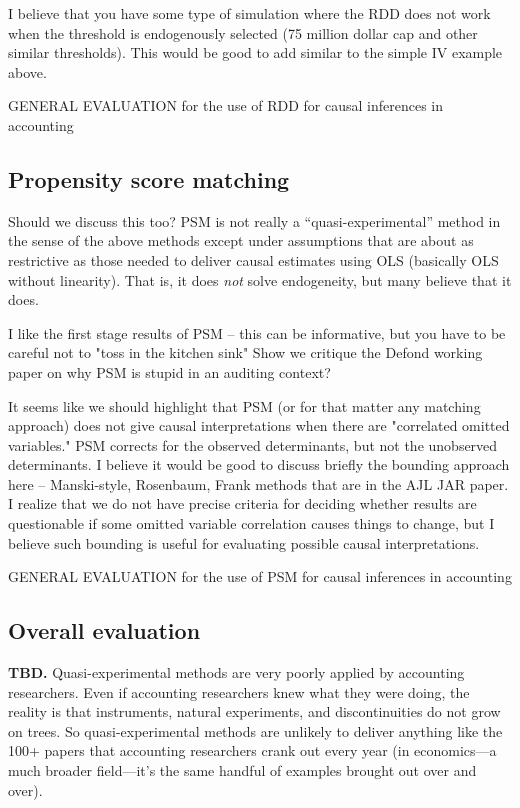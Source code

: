 \documentclass[11pt]{amsart}
\begin{document}
I believe that you have some type of simulation where the RDD does not work when the threshold is endogenously selected (75 million dollar cap and other similar thresholds).  This would be good to add similar to the simple IV example above.

GENERAL EVALUATION for the use of RDD for causal inferences in accounting 


\subsection{Propensity score matching}

Should we discuss this too? PSM is not really a ``quasi-experimental'' method in the sense of the above methods except under assumptions that are about as restrictive as those needed to deliver causal estimates using OLS (basically OLS without linearity). That is, it does \emph{not} solve endogeneity, but many believe that it does.

I like the first stage results of PSM -- this can be informative, but you have to be careful not to "toss in the kitchen sink"  Show we critique the Defond working paper on why PSM is stupid in an auditing context?

It seems like we should highlight that PSM (or for that matter any matching approach) does not give causal interpretations when there are "correlated omitted variables."  PSM corrects for the observed determinants, but not the unobserved determinants.  I believe it would be good to discuss briefly the bounding approach here -- Manski-style, Rosenbaum, Frank methods that are in the AJL JAR paper.  I realize that we do not have precise criteria for deciding whether results are questionable if some omitted variable correlation causes things to change, but I believe such bounding is useful for evaluating possible causal interpretations.

GENERAL EVALUATION for the use of PSM for causal inferences in accounting 


\subsection{Overall evaluation} 
\textbf{TBD.} Quasi-experimental methods are very poorly applied by accounting researchers. Even if accounting researchers knew what they were doing, the reality is that instruments, natural experiments, and discontinuities do not grow on trees. So quasi-experimental methods are unlikely to deliver anything like the 100+ papers that accounting researchers crank out every year (in economics---a much broader field---it's the same handful of examples brought out over and over).
\end{document}
